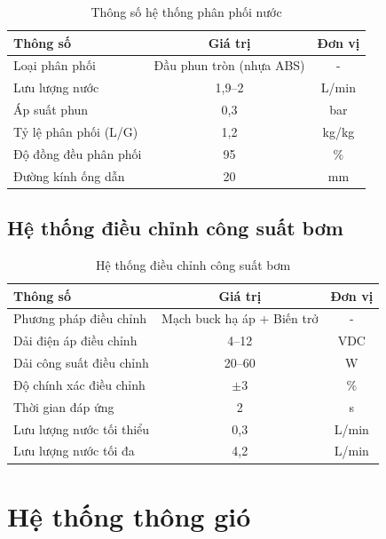 \documentclass[../main.tex]{subfiles}
\begin{document}
\begin{table}[H]
\centering
\renewcommand{\arraystretch}{1.1}
\caption{Thông số hệ thống phân phối nước}
\label{tab:distribution_specs}
\begin{tabular}{|l|c|c|}
\hline
\textbf{Thông số} & \textbf{Giá trị} & \textbf{Đơn vị} \\
\hline
Loại phân phối & Đầu phun tròn (nhựa ABS) & - \\
\hline
Lưu lượng nước & 1,9--2 & L/min \\
\hline
Áp suất phun & 0,3 & bar \\
\hline
Tỷ lệ phân phối (L/G) & 1,2 & kg/kg \\
\hline
Độ đồng đều phân phối & 95 & \% \\
\hline
Đường kính ống dẫn & 20 & mm \\
\hline
\end{tabular}
\end{table}

\subsection{Hệ thống điều chỉnh công suất bơm}
\label{sec:pump_power_control}

\begin{table}[H]
\centering
\renewcommand{\arraystretch}{1.1}
\caption{Hệ thống điều chỉnh công suất bơm}
\label{tab:pump_power_control_specs}
\begin{tabular}{|l|c|c|}
\hline
\textbf{Thông số} & \textbf{Giá trị} & \textbf{Đơn vị} \\
\hline
Phương pháp điều chỉnh & Mạch buck hạ áp + Biến trở & - \\
\hline
Dải điện áp điều chỉnh & 4--12 & VDC \\
\hline
Dải công suất điều chỉnh & 20--60 & W \\
\hline
Độ chính xác điều chỉnh & $\pm$3 & \% \\
\hline
Thời gian đáp ứng & 2 & s \\
\hline
Lưu lượng nước tối thiểu & 0,3 & L/min \\
\hline
Lưu lượng nước tối đa & 4,2 & L/min \\
\hline
\end{tabular}
\end{table}

\section{Hệ thống thông gió}
\label{sec:ventilation_system}
\end{document}
